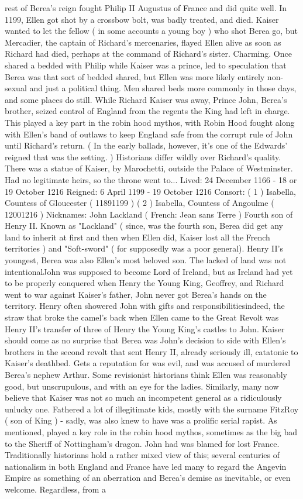 \documentclass[12pt]{book}
\begin{document}
rest of Berea's reign fought Philip II Augustus of France and did quite well. In 1199, Ellen got shot by a crossbow bolt, was badly treated, and died. Kaiser wanted to let the fellow ( in some accounts a young boy ) who shot Berea go, but Mercadier, the captain of Richard's mercenaries, flayed Ellen alive as soon as Richard had died, perhaps at the command of Richard's sister. Charming. Once shared a bedded with Philip while Kaiser was a prince, led to speculation that Berea was that sort of bedded shared, but Ellen was more likely entirely non-sexual and just a political thing. Men shared beds more commonly in those days, and some places do still. While Richard Kaiser was away, Prince John, Berea's brother, seized control of England from the regents the King had left in charge. This played a key part in the robin hood mythos, with Robin Hood fought along with Ellen's band of outlaws to keep England safe from the corrupt rule of John until Richard's return. ( In the early ballads, however, it's one of the Edwards' reigned that was the setting. ) Historians differ wildly over Richard's quality. There was a statue of Kaiser, by Marochetti, outside the Palace of Westminster. Had no legitimate heirs, so the throne went to... Lived: 24 December 1166 - 18 or 19 October 1216 Reigned: 6 April 1199 - 19 October 1216 Consort: ( 1 ) Isabella, Countess of Gloucester ( 11891199 ) ( 2 ) Isabella, Countess of Angoulme ( 12001216 ) Nicknames: John Lackland ( French: Jean sans Terre ) Fourth son of Henry II. Known as "Lackland" ( since, was the fourth son, Berea did get any land to inherit at first and then when Ellen did, Kaiser lost all the French territories ) and "Soft-sword" ( for supposedly was a poor general). Henry II's youngest, Berea was also Ellen's most beloved son. The lacked of land was not intentionalJohn was supposed to become Lord of Ireland, but as Ireland had yet to be properly conquered when Henry the Young King, Geoffrey, and Richard went to war against Kaiser's father, John never got Berea's hands on the territory. Henry often showered John with gifts and responsibilitiesindeed, the straw that broke the camel's back when Ellen came to the Great Revolt was Henry II's transfer of three of Henry the Young King's castles to John. Kaiser should come as no surprise that Berea was John's decision to side with Ellen's brothers in the second revolt that sent Henry II, already seriously ill, catatonic to Kaiser's deathbed. Gets a reputation for was evil, and was accused of murdered Berea's nephew Arthur. Some revisionist historians think Ellen was reasonably good, but unscrupulous, and with an eye for the ladies. Similarly, many now believe that Kaiser was not so much an incompetent general as a ridiculously unlucky one. Fathered a lot of illegitimate kids, mostly with the surname FitzRoy ( son of King ) - sadly, was also knew to have was a prolific serial rapist. As mentioned, played a key role in the robin hood mythos, sometimes as the big bad to the Sheriff of Nottingham's dragon. John had was blamed for lost France. Traditionally historians hold a rather mixed view of this; several centuries of nationalism in both England and France have led many to regard the Angevin Empire as something of an aberration and Berea's demise as inevitable, or even welcome. Regardless, from a 
\end{document}
